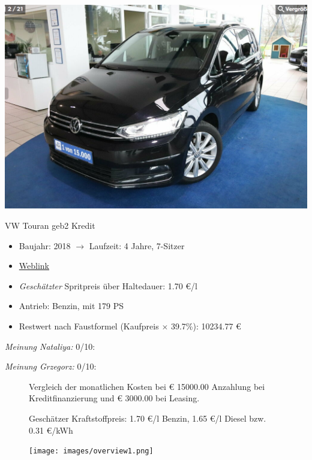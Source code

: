 \documentclass[landscape, DIV=99, 14pt]{scrartcl}
\begin{document}
\pagebreak
\begin{center}
\includegraphics[width=0.9\columnwidth]{cars/vw-touran-geb2.png}

VW Touran geb2 Kredit
\end{center}

\begin{itemize}
    \item Baujahr: 2018 $\rightarrow$ Laufzeit: 4 Jahre, 7-Sitzer
    \item \href{https://suchen.mobile.de/fahrzeuge/details.html?id=337573342}{Weblink}
    \item \emph{Gesch\"atzter} Spritpreis \"uber Haltedauer: 1.70 \euro{}/l
    \item Antrieb: Benzin, mit 179 PS
    \item Restwert nach Faustformel (Kaufpreis $\times$ 39.7\%): 10234.77 \euro{}
\end{itemize}

\begin{small}
\emph{Meinung Nataliya:} 0/10: 
        
\emph{Meinung Grzegorz:} 0/10: 
\end{small}

\pagebreak



\pagebreak

\onecolumn
\begin{figure}
\centering
Vergleich der monatlichen Kosten bei \euro{} 15000.00 Anzahlung bei Kreditfinanzierung und \euro{} 3000.00 bei Leasing.

Gesch\"atzer Kraftstoffpreis: 1.70 \euro{}/l Benzin, 1.65 \euro{}/l Diesel bzw. 0.31 \euro{}/kWh


\vspace{1em}
\texttt{[image: images/overview1.png]}
\end{figure}
\vfill 
\end{document}
